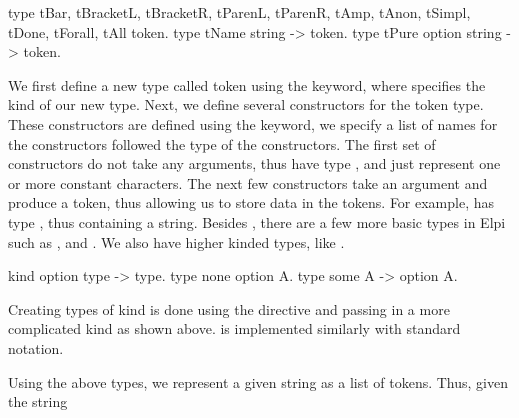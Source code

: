 \documentclass[thesis.tex]{subfiles}
\begin{document}
{\begin{elpicode}
  type tBar, tBracketL, tBracketR, tParenL, tParenR,
       tAmp, tAnon, tSimpl, tDone, tForall, tAll token.
  type tName string -> token.
  type tPure option string -> token.
\end{elpicode}
We first define a new type called token using the  keyword, where  specifies the kind of our new type. Next, we define several constructors for the token type. These constructors are defined using the  keyword, we specify a list of names for the constructors followed the type of the constructors. The first set of constructors do not take any arguments, thus have type , and just represent one or more constant characters. The next few constructors take an argument and produce a token, thus allowing us to store data in the tokens. For example,  has type , thus containing a string. Besides , there are a few more basic types in Elpi such as ,  and . We also have higher kinded types, like .
\begin{elpicode}
  kind option type -> type.
  type none option A.
  type some A -> option A.
\end{elpicode}
Creating types of kind  is done using the  directive and passing in a more complicated kind as shown above.  is implemented similarly with standard notation.

Using the above types, we represent a given string as a list of tokens. Thus, given the string \elpii{"[H %
\begin{center}
    \elpii{[tBracketL, tName "H", tPure (some "H'"), tBracketR]}
\end{center}

}}
\end{document}

